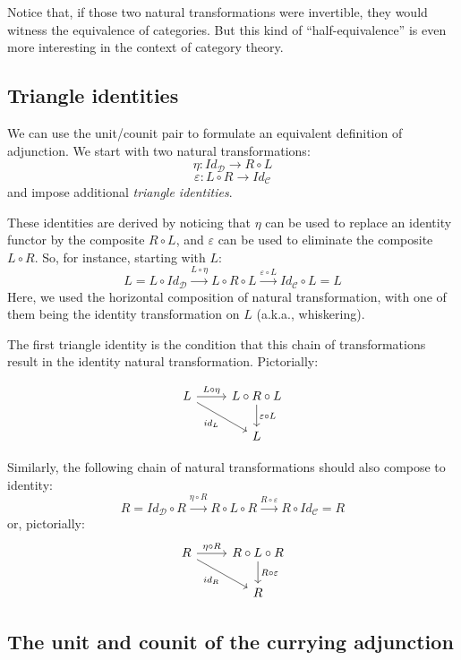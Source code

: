 \documentclass[DaoFP]{subfiles}
\begin{document}
Notice that, if those two natural transformations were invertible, they would witness the equivalence of categories. But this kind of ``half-equivalence'' is even more interesting in the context of category theory. 

\subsection{Triangle identities}

We can use the unit/counit pair to formulate an equivalent  definition of adjunction. We start with two natural transformations:
\[ \eta \colon Id_{\mathcal{D}} \to R \circ L \]
\[ \varepsilon \colon L \circ R \to Id_{\mathcal{C}}  \]
and impose additional \emph{triangle identities}. 

These identities are derived by noticing that $\eta$ can be used to replace an identity functor by the composite $R \circ L$, and $\varepsilon$ can be used to eliminate the composite $L \circ R$. So, for instance, starting with $L$:
\[ L = L \circ Id_{\mathcal{D}} \xrightarrow{L \circ \eta} L \circ R \circ L \xrightarrow{\varepsilon \circ L} Id_{\mathcal{C}} \circ L = L \]
Here, we used the horizontal composition of natural transformation, with one of them being the identity transformation on $L$ (a.k.a., whiskering).

The first triangle identity is the condition that this chain of transformations result in the identity natural transformation. Pictorially:

\[
 \begin{tikzcd}
 L
 \arrow[r, "L \circ \eta"]
 \arrow[rd, "id_L"']
 & L \circ R \circ L
 \arrow[d, "\varepsilon \circ L"]
 \\
 & L
  \end{tikzcd}
\]

Similarly, the following chain of natural transformations should also compose to identity:
\[ R = Id_{\mathcal{D}} \circ R \xrightarrow{\eta \circ R} R \circ L \circ R \xrightarrow{R \circ \varepsilon} R \circ Id_{\mathcal{C}} = R \]
or, pictorially:
\[
 \begin{tikzcd}
 R
 \arrow[r, "\eta \circ R"]
 \arrow[rd, "id_R"']
 & R \circ L \circ R
 \arrow[d, "R \circ \varepsilon"]
 \\
 & R
  \end{tikzcd}
\]

\subsection{The unit and counit of the currying adjunction}
\end{document}
